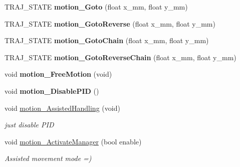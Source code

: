 \begin{DoxyCompactItemize}
\item 
\mbox{\label{classAsservN_ab2e3a15f544fa5a91388bed5d85e23ee}} 
T\+R\+A\+J\+\_\+\+S\+T\+A\+TE {\bfseries motion\+\_\+\+Goto} (float x\+\_\+mm, float y\+\_\+mm)
\item 
\mbox{\label{classAsservN_aa96de08c966c3c436b7394c1da30829c}} 
T\+R\+A\+J\+\_\+\+S\+T\+A\+TE {\bfseries motion\+\_\+\+Goto\+Reverse} (float x\+\_\+mm, float y\+\_\+mm)
\item 
\mbox{\label{classAsservN_af752b6ca5bb9746c6d36d8afea5279dc}} 
T\+R\+A\+J\+\_\+\+S\+T\+A\+TE {\bfseries motion\+\_\+\+Goto\+Chain} (float x\+\_\+mm, float y\+\_\+mm)
\item 
\mbox{\label{classAsservN_a5c0b3eb6123a63db0be64b7fffbc4c42}} 
T\+R\+A\+J\+\_\+\+S\+T\+A\+TE {\bfseries motion\+\_\+\+Goto\+Reverse\+Chain} (float x\+\_\+mm, float y\+\_\+mm)
\item 
\mbox{\label{classAsservN_a0b2775d27df7c46f5610a33cfc440f17}} 
void {\bfseries motion\+\_\+\+Free\+Motion} (void)
\item 
\mbox{\label{classAsservN_aaeef54f7dc01a4b2ecd9d5b36bfdf96f}} 
void {\bfseries motion\+\_\+\+Disable\+P\+ID} ()
\item 
\mbox{\label{classAsservN_aabc80ed92d945446839d0a3773281145}} 
void \hyperlink{classAsservN_aabc80ed92d945446839d0a3773281145}{motion\+\_\+\+Assisted\+Handling} (void)
\begin{DoxyCompactList}\small\item\em just disable P\+ID \end{DoxyCompactList}\item 
\mbox{\label{classAsservN_ad45f8806ed73aa5c2e304dd05c6d1557}} 
void \hyperlink{classAsservN_ad45f8806ed73aa5c2e304dd05c6d1557}{motion\+\_\+\+Activate\+Manager} (bool enable)
\begin{DoxyCompactList}\small\item\em Assisted movement mode =) \end{DoxyCompactList}\item 
\mbox{\label{classAsservN_a022af36a8d30db53a0d2b6979c56ef26}} 

\end{DoxyCompactItemize}
